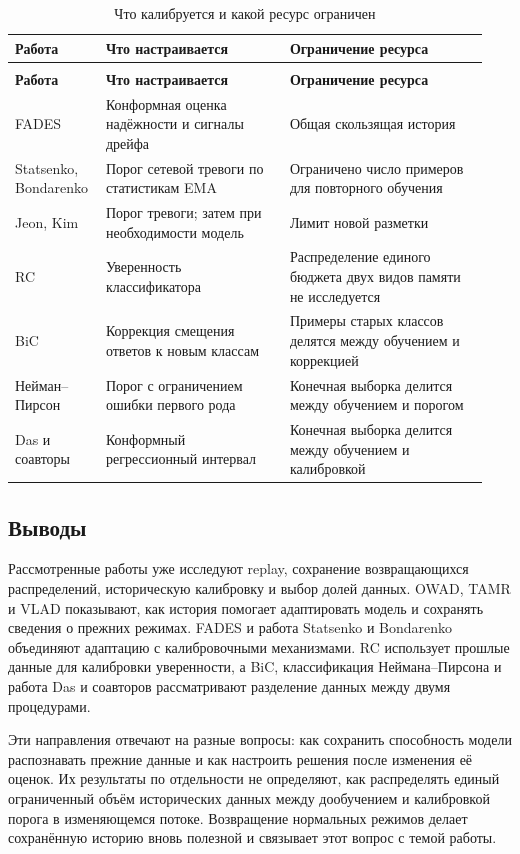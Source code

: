 \begingroup
\small
\setlength{\tabcolsep}{4pt}
\renewcommand{\arraystretch}{1.15}
\begin{longtable}{@{}>{\raggedright\arraybackslash}p{0.17\linewidth}
                        >{\raggedright\arraybackslash}p{0.37\linewidth}
                        >{\raggedright\arraybackslash}p{0.40\linewidth}@{}}
\caption{Что калибруется и какой ресурс ограничен}
\label{tab:related_calibration}\\
\toprule
\textbf{Работа} & \textbf{Что настраивается} & \textbf{Ограничение ресурса}\\
\midrule
\endfirsthead
\multicolumn{3}{l}{Продолжение таблицы~\thetable}\\
\toprule
\textbf{Работа} & \textbf{Что настраивается} & \textbf{Ограничение ресурса}\\
\midrule
\endhead
\bottomrule
\endfoot
FADES & Конформная оценка надёжности и сигналы дрейфа & Общая скользящая история\\
Statsenko, Bondarenko & Порог сетевой тревоги по статистикам EMA & Ограничено число примеров для повторного обучения\\
Jeon, Kim & Порог тревоги; затем при необходимости модель & Лимит новой разметки\\
RC & Уверенность классификатора & Распределение единого бюджета двух видов памяти не исследуется\\
BiC & Коррекция смещения ответов к новым классам & Примеры старых классов делятся между обучением и коррекцией\\
Нейман--Пирсон & Порог с ограничением ошибки первого рода & Конечная выборка делится между обучением и порогом\\
Das и соавторы & Конформный регрессионный интервал & Конечная выборка делится между обучением и калибровкой\\
\end{longtable}
\endgroup

\clearpage
\subsection{Выводы}
\label{subsec:related_conclusions}

Рассмотренные работы уже исследуют replay, сохранение возвращающихся
распределений, историческую калибровку и выбор долей данных.
OWAD, TAMR и VLAD показывают, как история помогает адаптировать
модель и сохранять сведения о прежних режимах. FADES и работа
Statsenko и Bondarenko объединяют адаптацию с калибровочными
механизмами. RC использует прошлые данные для калибровки
уверенности, а BiC, классификация Неймана--Пирсона и работа
Das и соавторов рассматривают разделение данных между двумя
процедурами.

Эти направления отвечают на разные вопросы: как сохранить
способность модели распознавать прежние данные и как настроить
решения после изменения её оценок. Их результаты по отдельности
не определяют, как распределять единый ограниченный объём
исторических данных между дообучением и калибровкой порога
в изменяющемся потоке. Возвращение нормальных режимов делает
сохранённую историю вновь полезной и связывает этот вопрос
с темой работы.

\nocite{RCCode,RCReproduction}
